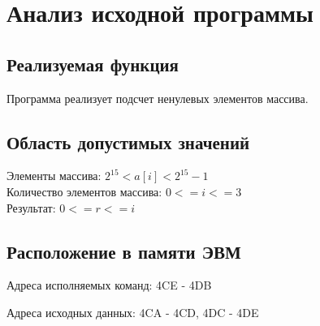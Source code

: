 \documentclass[14pt]{extreport}
\begin{document}
    \chapter{Анализ исходной программы}
    \section{Реализуемая функция}
        Программа реализует подсчет ненулевых элементов массива.

    \section{Область допустимых значений}


        Элементы массива: $2^{15} < a[i] < 2^{15}-1$ \\


        Количество элементов массива: $ 0 <= i <= 3$ \\


        Результат: $0 <= r <= i$ \\

    \section{Расположение в памяти ЭВМ}

        Адреса исполняемых команд: 4CE - 4DB

        Адреса исходных данных: 4CA - 4CD, 4DC - 4DE
\end{document}
